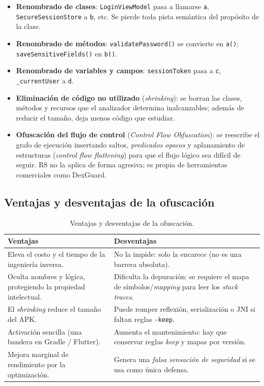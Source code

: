 \documentclass[12pt,letterpaper]{article}
\begin{document}
\begin{itemize}[leftmargin=1.4em]
  \item \textbf{Renombrado de clases}: \texttt{LoginViewModel} pasa a llamarse
        \texttt{a}, \texttt{SecureSessionStore} a \texttt{b}, etc. Se pierde toda
        pista semántica del propósito de la clase.
  \item \textbf{Renombrado de métodos}: \texttt{validatePassword()} se convierte
        en \texttt{a()}; \texttt{saveSensitiveFields()} en \texttt{b()}.
  \item \textbf{Renombrado de variables y campos}: \texttt{sessionToken} pasa a
        \texttt{c}, \texttt{\_currentUser} a \texttt{d}.
  \item \textbf{Eliminación de código no utilizado} (\emph{shrinking}): se borran
        las clases, métodos y recursos que el analizador determina inalcanzables;
        además de reducir el tamaño, deja menos código que estudiar.
  \item \textbf{Ofuscación del flujo de control} (\emph{Control Flow
        Obfuscation}): se reescribe el grafo de ejecución insertando saltos,
        \emph{predicados opacos} y aplanamiento de estructuras (\emph{control flow
        flattening}) para que el flujo lógico sea difícil de seguir. R8 no la
        aplica de forma agresiva; es propia de herramientas comerciales como
        DexGuard.
\end{itemize}

\subsection{Ventajas y desventajas de la ofuscación}

\begin{table}[h]
\centering
\caption{Ventajas y desventajas de la ofuscación.}
\label{tab:ventajas}
\renewcommand{\arraystretch}{1.25}
\begin{tabularx}{\linewidth}{X X}
\toprule
\textbf{Ventajas} & \textbf{Desventajas} \\
\midrule
Eleva el costo y el tiempo de la ingeniería inversa. & No la impide: solo la encarece (no es una barrera absoluta). \\
Oculta nombres y lógica, protegiendo la propiedad intelectual. & Dificulta la depuración: se requiere el mapa de símbolos/\emph{mapping} para leer los \emph{stack traces}. \\
El \emph{shrinking} reduce el tamaño del APK. & Puede romper reflexión, serialización o JNI si faltan reglas \texttt{-keep}. \\
Activación sencilla (una bandera en Gradle / Flutter). & Aumenta el mantenimiento: hay que conservar reglas \emph{keep} y mapas por versión. \\
Mejora marginal de rendimiento por la optimización. & Genera una \emph{falsa sensación de seguridad} si se usa como única defensa. \\
\bottomrule
\end{tabularx}
\end{table}
\end{document}
